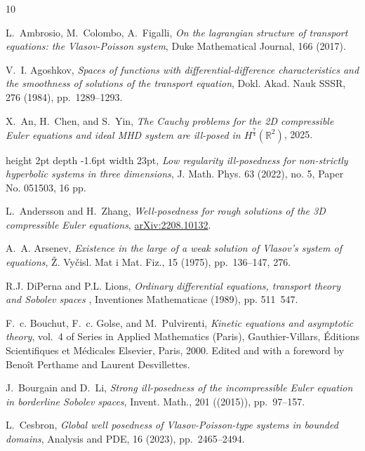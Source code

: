 \documentclass[11pt]{amsart}
\theoremstyle{definition}
\theoremstyle{remark}
\numberwithin{equation}{section}
\newcommand{\0}{\emptyset}
\begin{document}
	
	
	\begin{thebibliography}{10}
		
		{\sc L.~Ambrosio, M.~Colombo, A.~Figalli}, {\em On the lagrangian structure of
			transport equations: the {V}lasov-{P}oisson system}, Duke Mathematical Journal,
		166 (2017).
		
		{\sc V.~I. Agoshkov}, {\em Spaces of functions with differential-difference
			characteristics and the smoothness of solutions of the transport equation},
		Dokl. Akad. Nauk SSSR, 276 (1984), pp.~1289--1293.
		
		{\sc X.~An, H.~Chen, and S.~Yin}, {\em The {C}auchy problems for the 2{D}
			compressible {E}uler equations and ideal {M}{H}{D} system are ill-posed in
			${H}^\frac{7}{4}(\mathbb{R}^2)$}, 2025.
		
		\leavevmode\vrule height 2pt depth -1.6pt width 23pt, {\em Low regularity ill-posedness for non-strictly hyperbolic systems in three dimensions}, 
		J. Math. Phys. 63 (2022), no. 5, Paper No. 051503, 16 pp.
		
		{\sc L.~Andersson and H.~Zhang}, {\em 
			Well-posedness for rough solutions of the 3{D} compressible {E}uler equations}, 		\newblock \href{https://arxiv.org/abs/2208.10132}{arXiv:2208.10132}.
		
		{\sc A.~A. Arsenev}, {\em Existence in the large of a weak solution of
			{V}lasov's system of equations}, \v Z. Vy\v cisl. Mat i Mat. Fiz., 15 (1975),
		pp.~136--147, 276.
		
		{R.J. DiPerna and P.L. Lions}, {\em Ordinary differential equations, transport theory and Sobolev spaces }, Inventiones Mathematicae (1989), pp. 511~547.
		
		{\sc F.~c. Bouchut, F.~c. Golse, and M.~Pulvirenti}, {\em Kinetic equations and
			asymptotic theory}, vol.~4 of Series in Applied Mathematics (Paris),
		Gauthier-Villars, \'Editions Scientifiques et M\'edicales Elsevier, Paris,
		2000.
		\newblock Edited and with a foreword by Beno\^it Perthame and Laurent
		Desvillettes.
		
		{\sc J.~Bourgain and D.~Li}, {\em Strong ill-posedness of the incompressible
			{E}uler equation in borderline {S}obolev spaces}, Invent. Math., 201
		((2015)), pp.~97--157.
		
		{\sc L.~Cesbron}, {\em Global well posedness of {V}lasov-{P}oisson-type systems in
			bounded domains}, Analysis and PDE, 16 (2023), pp.~2465--2494.
		

\end{thebibliography}
\end{document}
